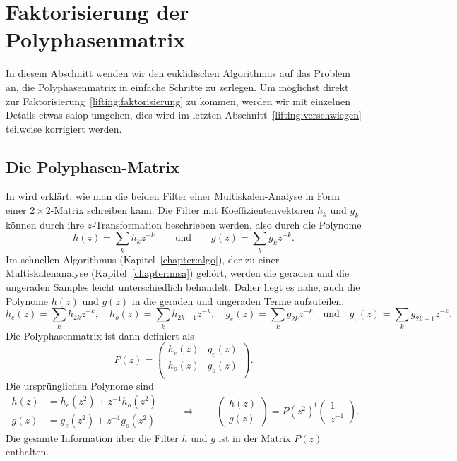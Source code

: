 %
%
\section{Faktorisierung der Polyphasenmatrix}
In diesem Abschnitt wenden wir den euklidischen Algorithmus auf das
Problem an, die Polyphasenmatrix in einfache Schritte zu zerlegen.
Um möglichst direkt zur Faktorisierung~\eqref{lifting:faktorisierung}
zu kommen, werden wir mit einzelnen Details etwas salop umgehen, dies wird
im letzten Abschnitt~\ref{lifting:verschwiegen} teilweise korrigiert werden.

\subsection{Die Polyphasen-Matrix}
In \cite{lifting:Daubechies1998} wird erklärt, wie man die beiden
Filter einer Multiskalen-Analyse in Form einer $2\times 2$-Matrix
schreiben kann.
Die Filter mit Koeffizientenvektoren $h_k$ und $g_k$ können durch 
ihre $z$-Transformation beschrieben werden, also durch die Polynome
\[
h(z) = \sum_{k} h_kz^{-k}
\qquad\text{und}\qquad
g(z) = \sum_{k} g_kz^{-k}.
\]
Im schnellen Algorithmus (Kapitel~\ref{chapter:algo}), der zu einer
Multiskalenanalyse (Kapitel~\ref{chapter:msa}) gehört, werden die
geraden und die ungeraden Samples leicht unterschiedlich behandelt.
Daher liegt es nahe, auch die Polynome $h(z)$ und $g(z)$ in die
geraden und ungeraden Terme aufzuteilen:
\[
h_e(z) = \sum_k h_{2k}z^{-k},
\quad
h_o(z) = \sum_k h_{2k+1}z^{-k},
\quad
g_e(z) = \sum_k g_{2k}z^{-k}
\quad\text{und}\quad
g_o(z) = \sum_k g_{2k+1}z^{-k}.
\]
Die Polyphasenmatrix ist dann definiert als
\[
P(z)
=
\begin{pmatrix}
h_e(z)&g_e(z)\\
h_o(z)&g_o(z)\\
\end{pmatrix}.
\]
Die ursprünglichen Polynome sind
\[
\begin{aligned}
h(z) &= h_e(z^2) + z^{-1}h_o(z^2)\\
g(z) &= g_e(z^2) + z^{-1}g_o(z^2)
\end{aligned}
\qquad\Rightarrow\qquad
\begin{pmatrix}
h(z)\\
g(z)
\end{pmatrix}
=
P(z^2)^t
\begin{pmatrix} 1\\ z^{-1} \end{pmatrix}.
\]
Die gesamte Information über die Filter $h$ und $g$ ist in der Matrix
$P(z)$ enthalten.


